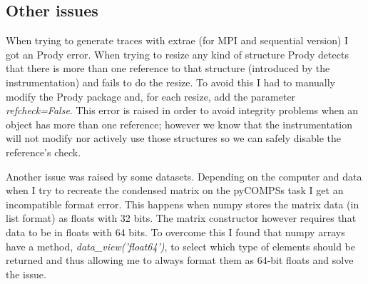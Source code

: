 

\subsection{Other issues}


When trying to generate traces with extrae (for MPI and sequential version) I got an Prody error. When trying to resize any kind of structure Prody detects that there is more than one reference to that structure (introduced by the instrumentation) and fails to do the resize. To avoid this I had to manually modify the Prody package and, for each resize, add the parameter \textit{refcheck=False}. This error is raised in order to avoid integrity problems when an object has more than one reference; however we know that the instrumentation will not modify nor actively use those structures so we can safely disable the reference's check. 

Another issue was raised by some datasets. Depending on the computer and data when I try to recreate the condensed matrix on the pyCOMPSs task I get an incompatible format error. This happens when numpy stores the matrix data (in list format) as floats with 32 bits. The matrix constructor however requires that data to be in floats with 64 bits. To overcome this I found that numpy arrays have a method, \textit{data\_view('float64')}, to select which type of elements should be returned and thus allowing me to always format them as 64-bit floats and solve the issue.







